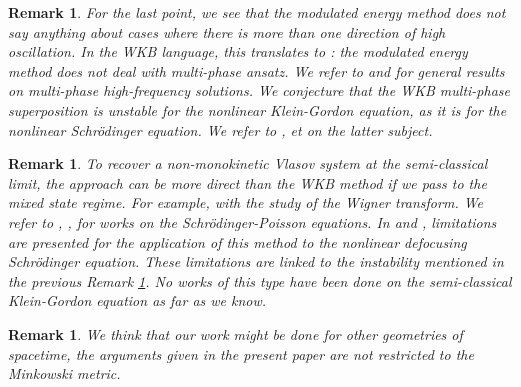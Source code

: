\documentclass[a4paper, 15pt]{article}
\numberwithin{equation}{section}
\newtheorem{rem}[defi]{Remark}
\begin{document}
\begin{rem} 
\label{rem:instabil} For the last point, we see that the modulated energy method does not say anything about cases where there is more than one direction of high oscillation. In the WKB language, this translates to : the modulated energy method does not deal with multi-phase ansatz. We refer to \cite{METIVIER2009169} and \cite{zbMATH06039454} for general results on multi-phase high-frequency solutions. We conjecture that the WKB multi-phase superposition is unstable for the nonlinear Klein-Gordon equation, as it is for the nonlinear Schrödinger equation. We refer to \cite{carles2023nonlineareffectsmultiphasewkb}, \cite{zbMATH05243173} et \cite{Han_Kwan_2016} on the latter subject.\\
\end{rem}
\begin{rem}
    To recover a non-monokinetic Vlasov system at the semi-classical limit, the approach can be more direct than the WKB method if we pass to the mixed state regime. For example, with the study of the Wigner transform. We refer to \cite{zbMATH00482230}, \cite{zbMATH00203353}, for works on the Schrödinger-Poisson equations. In \cite{Mauser2002SemiclassicalLO} and \cite{Carles_2009}, limitations are presented for the application of this method to the nonlinear defocusing Schrödinger equation. These limitations are linked to the instability mentioned in the previous Remark \ref{rem:instabil}. No works of this type have been done on the semi-classical Klein-Gordon equation as far as we know.\\
\end{rem}
\begin{rem}
We think that our work might be done for other geometries of spacetime, the arguments given in the present paper are not restricted to the Minkowski metric.
\end{rem}
\end{document}
